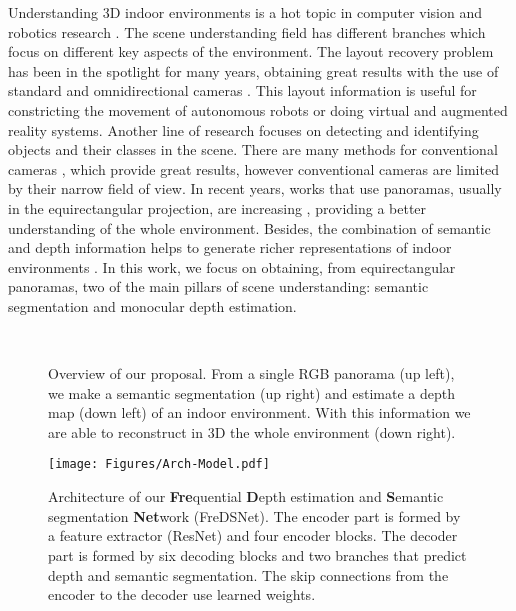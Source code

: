 \documentclass[letterpaper, 10 pt, conference]{ieeeconf}
\begin{document}
Understanding 3D indoor environments is a hot topic in computer vision and robotics research \cite{naseer2018indoor}\cite{zou2021manhattan}. The scene understanding field has different branches which focus on different key aspects of the environment. The layout recovery problem has been in the spotlight for many years, obtaining great results with the use of standard and omnidirectional cameras \cite{berenguel2021scaled}\cite{fernandez2020corners}\cite{pintore2020atlantanet}\cite{sun2019horizonnet}. 
This layout information is useful for constricting the movement of autonomous robots \cite{rusli2020roomslam}\cite{salas2015layout} or doing virtual and augmented reality systems.
Another line of research focuses on detecting and identifying objects and their classes in the scene. 
There are many methods for conventional cameras \cite{dvornik2017blitznet}\cite{he2017mask}\cite{russakovsky2015imagenet}, which provide great results, however conventional cameras are limited by their narrow field of view. In recent years, works that use panoramas, usually in the equirectangular projection, are increasing \cite{eder2020tangent}\cite{guerrero2020s}, providing a better understanding of the whole environment.
Besides, the combination of semantic and depth information helps to generate richer representations of indoor environments \cite{koppula2011semantic}\cite{ye2018recurrent}. 
In this work, we focus on obtaining, from equirectangular panoramas, two of the main pillars of scene understanding: semantic segmentation and monocular depth estimation.

\begin{figure}[t]
\centering
{} \hfil
{} \\
 \hfil
{}
\caption{Overview of our proposal. From a single RGB panorama (up left), we make a semantic segmentation (up right) and estimate a depth map (down left) of an indoor environment. With this information we are able to reconstruct in 3D the whole environment (down right).}
\label{fig:intro}
\end{figure}

\begin{figure*}[t]
\centering
\texttt{[image: Figures/Arch-Model.pdf]}
\caption{Architecture of our {\bf Fre}quential {\bf D}epth estimation and {\bf S}emantic segmentation {\bf Net}work (FreDSNet). The encoder part is formed by a feature extractor (ResNet) and four encoder blocks. The decoder part is formed by six decoding blocks and two branches that predict depth and semantic segmentation. The skip connections from the encoder to the decoder use learned weights.}
\label{fig:modelArch}
\end{figure*}
\end{document}
